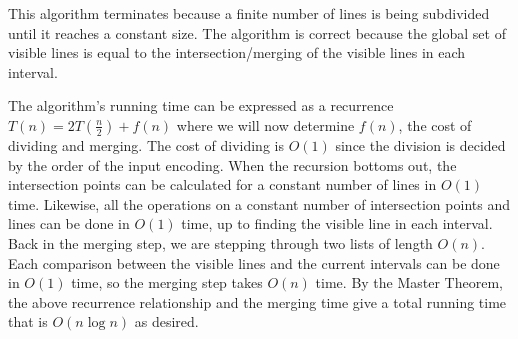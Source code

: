 \documentclass[12pt]{article}
\begin{document}
This algorithm terminates because a finite number of lines is being
subdivided until it reaches a constant size. The algorithm is correct
because the global set of visible lines is equal to the intersection/merging of
the visible lines in each interval.

The algorithm's
running time can be expressed as a recurrence $T(n) = 2T(\frac{n}{2}) + f(n)$
where we will now determine $f(n)$, the cost of dividing and merging.
The cost of dividing is $O(1)$ since the division is decided by the
order of the input encoding. When the recursion bottoms out, the
intersection points can be calculated for a constant number of lines in
$O(1)$ time. Likewise, all the operations on a constant number of
intersection points and lines can be done in $O(1)$ time, up to
finding the visible line in each interval. Back in the merging step,
we are stepping through two lists of length $O(n)$. Each comparison
between the visible lines and the current intervals can be done in
$O(1)$ time, so the merging step takes $O(n)$ time.
By the Master Theorem, the above recurrence relationship and the merging
time give a total running time that is $O(n\log{n})$ as desired.
\end{document}
